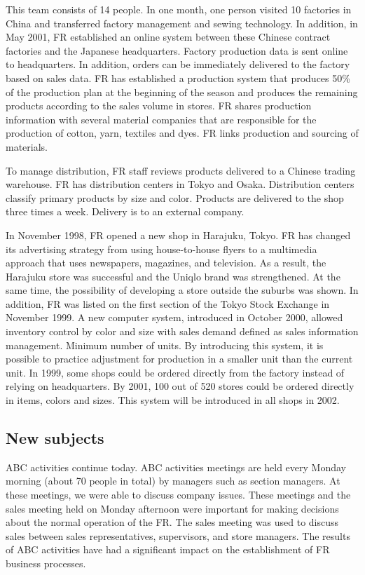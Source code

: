 \documentclass[12pt,a4paper]{article}
\begin{document}
This team consists of 14 people. In one month, one person visited 10
factories in China and transferred factory management and sewing
technology. In addition, in May 2001, FR established an online system
between these Chinese contract factories and the Japanese headquarters.
Factory production data is sent online to headquarters. In addition,
orders can be immediately delivered to the factory based on sales data.
FR has established a production system that produces 50\% of the
production plan at the beginning of the season and produces the
remaining products according to the sales volume in stores. FR shares
production information with several material companies that are
responsible for the production of cotton, yarn, textiles and dyes. FR
links production and sourcing of materials.

To manage distribution, FR staff reviews products delivered to a Chinese
trading warehouse. FR has distribution centers in Tokyo and Osaka.
Distribution centers classify primary products by size and color.
Products are delivered to the shop three times a week. Delivery is to an
external company.

In November 1998, FR opened a new shop in Harajuku, Tokyo. FR has
changed its advertising strategy from using house-to-house flyers to a
multimedia approach that uses newspapers, magazines, and television. As
a result, the Harajuku store was successful and the Uniqlo brand was
strengthened. At the same time, the possibility of developing a store
outside the suburbs was shown. In addition, FR was listed on the first
section of the Tokyo Stock Exchange in November 1999. A new computer
system, introduced in October 2000, allowed inventory control by color
and size with sales demand defined as sales information management.
Minimum number of units. By introducing this system, it is possible to
practice adjustment for production in a smaller unit than the current
unit. In 1999, some shops could be ordered directly from the factory
instead of relying on headquarters. By 2001, 100 out of 520 stores could
be ordered directly in items, colors and sizes. This system will be
introduced in all shops in 2002.

\hypertarget{new-subjects}{%
\subsection{New subjects}\label{new-subjects}}

ABC activities continue today. ABC activities meetings are held every
Monday morning (about 70 people in total) by managers such as section
managers. At these meetings, we were able to discuss company issues.
These meetings and the sales meeting held on Monday afternoon were
important for making decisions about the normal operation of the FR. The
sales meeting was used to discuss sales between sales representatives,
supervisors, and store managers. The results of ABC activities have had
a significant impact on the establishment of FR business processes.
\end{document}
